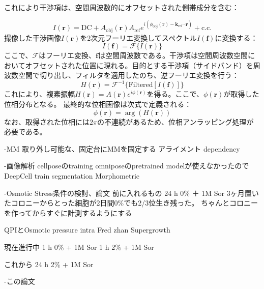 これにより干渉項は、空間周波数的にオフセットされた側帯成分を含む：

\begin{equation}
I(\bm{r}) = \text{DC} + A_{\mathrm{obj}}(\bm{r}) A_{\mathrm{ref}} e^{i (\phi_{\mathrm{obj}}(\bm{r}) - \bm{k}_{\mathrm{ref}} \cdot \bm{r})} + \text{c.c.}
\end{equation}
撮像した干渉画像$I(\bm{r})$を2次元フーリエ変換してスペクトル$I(\bm{f})$に変換する：
\begin{equation}
I(\bm{f}) = \mathcal{F}\{ I(\bm{r}) \}
\end{equation}
ここで、$\mathcal{F}$はフーリエ変換、$\bm{f}$は空間周波数である。干渉項は空間周波数空間においてオフセットされた位置に現れる。目的とする干渉項（サイドバンド）を周波数空間で切り出し、フィルタを適用したのち、逆フーリエ変換を行う：
\begin{equation}
H(\bm{r}) = \mathcal{F}^{-1}\{ \text{Filtered}[I(\bm{f})] \}
\end{equation}
これにより、複素振幅$H(\bm{r}) = A(\bm{r}) e^{i \phi(\bm{r})}$を得る。ここで、$\phi(\bm{r})$が取得した位相分布となる。
最終的な位相画像は次式で定義される：
\begin{equation}
\phi(\bm{r}) = \arg \left( H(\bm{r}) \right)
\end{equation}
なお、取得された位相には$2\pi$の不連続があるため、位相アンラッピング処理が必要である。

-MM
取り外し可能な、固定台にMMを固定する
アライメント
dependency

-画像解析
cellposeのtraining
omniposeのpretrained modelが使えなかったので
DeepCell
train
segmentation
Morphometric

-Osmotic Stress条件の検討、論文
前に入れるもの 
24 h 0\% ＋ 1M Sor 3ヶ月置いたコロニーからとった細胞が2日間0\%でも2/3位生き残った。
ちゃんとコロニーを作ってからすぐに計測するようにする

QPIとOsmotic pressure
intra
Fred zhan
Supergrowth

現在進行中
1 h 0\% + 1M Sor
1 h 2\% + 1M Sor

これから
24 h 2\% + 1M Sor

-この論文

